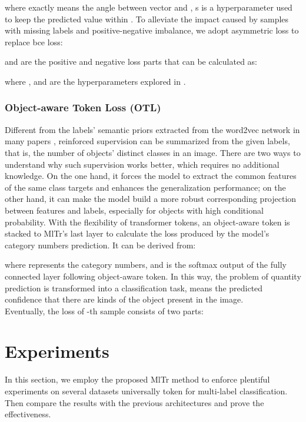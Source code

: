 \documentclass{article} \usepackage[numbers,sort&compress]{natbib}
\begin{document}
where  exactly means the angle between vector  and , s is a hyperparameter used to keep the predicted value within .
To alleviate the impact caused by samples with missing labels and positive-negative imbalance, we adopt asymmetric loss \cite{ben2020asymmetric} to replace bce loss:

 and  are the positive and negative loss parts that can be calculated as:

where ,  and  are the hyperparameters explored in \cite{ben2020asymmetric}.



\subsubsection{Object-aware Token Loss (OTL)}
Different from the labels' semantic priors extracted from the word2vec network in many papers \cite{chen2019multi,you2020cross,chen2019learning}, reinforced supervision can be summarized from the given labels, that is, the number of objects' distinct classes in an image. There are two ways to understand why such supervision works better, which requires no additional knowledge. On the one hand, it forces the model to extract the common features of the same class targets and enhances the generalization performance; on the other hand, it can make the model build a more robust corresponding projection between features and labels, especially for objects with high conditional probability. With the flexibility of transformer tokens, an object-aware token is stacked to MlTr's last layer to calculate the loss produced by the model's category numbers prediction. It can be derived from:

where  represents the category numbers, and  is the softmax output of the fully connected layer following object-aware token. In this way, the problem of quantity prediction is transformed into a classification task,  means the predicted confidence that there are  kinds of the object present in the image. \\
Eventually, the loss of -th sample consists of two parts:





\section{Experiments}
\label{result}
In this section, we employ the proposed MlTr method to enforce plentiful experiments on several datasets universally token for multi-label classification. Then compare the results with the previous architectures and prove the effectiveness.
\end{document}
